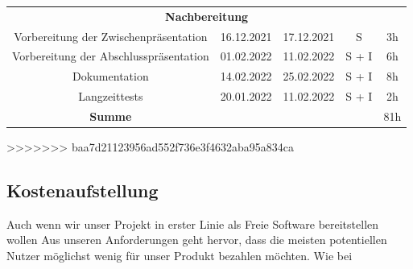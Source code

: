 \begin{adjustwidth}{-1in}{-1in}
\begin{center}
\begin{tabular}{ ccccc }
			\midrule
			\multicolumn{5}{c}{\textbf{Nachbereitung}} \\
			{Vorbereitung der Zwischenpräsentation} & {16.12.2021} & {17.12.2021} & S & 3h\\
			{Vorbereitung der Abschlusspräsentation} & {01.02.2022} & {11.02.2022} & S + I & 6h\\
			{Dokumentation} & {14.02.2022} & {25.02.2022} & S + I & 8h\\
			{Langzeittests} & {20.01.2022} & {11.02.2022} & S + I & 2h\\

			\midrule
			{\textbf{Summe}} & & & & 81h\\

			\bottomrule
		\end{tabular}
		 \label{tab:worklog} 
	\end{center}

\end{adjustwidth}
>>>>>>> baa7d21123956ad552f736e3f4632aba95a834ca

\newpage

\subsection{Kostenaufstellung} \label{Kostenaufstellung}

Auch wenn wir unser Projekt in erster Linie als Freie Software bereitstellen wollen
Aus unseren Anforderungen geht hervor, dass die meisten potentiellen Nutzer möglichst wenig für unser Produkt bezahlen möchten. Wie bei 


